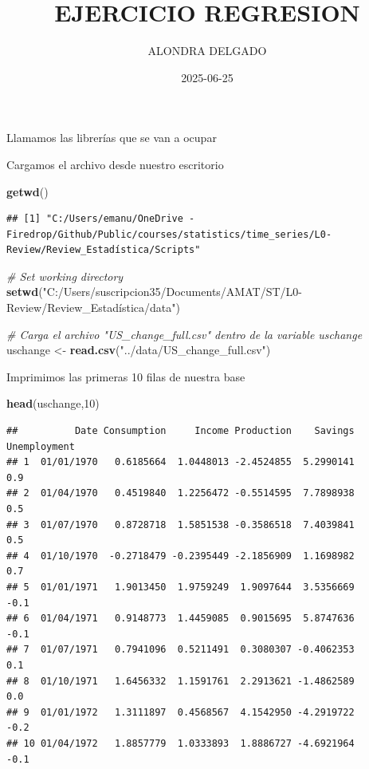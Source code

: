\documentclass[
]{article}
\title{EJERCICIO REGRESION}
\author{ALONDRA DELGADO}
\date{2025-06-25}
\newenvironment{Shaded}{\begin{snugshade}}{\end{snugshade}}
\newcommand{\CommentTok}[1]{\textcolor[rgb]{0.56,0.35,0.01}{\textit{#1}}}
\newcommand{\DecValTok}[1]{\textcolor[rgb]{0.00,0.00,0.81}{#1}}
\newcommand{\FunctionTok}[1]{\textcolor[rgb]{0.13,0.29,0.53}{\textbf{#1}}}
\newcommand{\NormalTok}[1]{#1}
\newcommand{\OtherTok}[1]{\textcolor[rgb]{0.56,0.35,0.01}{#1}}
\newcommand{\StringTok}[1]{\textcolor[rgb]{0.31,0.60,0.02}{#1}}
\begin{document}
\maketitle

Llamamos las librerías que se van a ocupar

Cargamos el archivo desde nuestro escritorio

\begin{Shaded}
\begin{Highlighting}[]
\FunctionTok{getwd}\NormalTok{()}
\end{Highlighting}
\end{Shaded}

\begin{verbatim}
## [1] "C:/Users/emanu/OneDrive - Firedrop/Github/Public/courses/statistics/time_series/L0-Review/Review_Estadística/Scripts"
\end{verbatim}

\begin{Shaded}
\begin{Highlighting}[]
\CommentTok{\# Set working directory}
\FunctionTok{setwd}\NormalTok{(}\StringTok{"C:/Users/suscripcion35/Documents/AMAT/ST/L0{-}Review/Review\_Estadística/data"}\NormalTok{)}

\CommentTok{\# Carga el archivo "US\_change\_full.csv" dentro de la variable uschange}
\NormalTok{uschange }\OtherTok{\textless{}{-}} \FunctionTok{read.csv}\NormalTok{(}\StringTok{"../data/US\_change\_full.csv"}\NormalTok{)}
\end{Highlighting}
\end{Shaded}

Imprimimos las primeras 10 filas de nuestra base

\begin{Shaded}
\begin{Highlighting}[]
\FunctionTok{head}\NormalTok{(uschange,}\DecValTok{10}\NormalTok{)}
\end{Highlighting}
\end{Shaded}

\begin{verbatim}
##          Date Consumption     Income Production    Savings Unemployment
## 1  01/01/1970   0.6185664  1.0448013 -2.4524855  5.2990141          0.9
## 2  01/04/1970   0.4519840  1.2256472 -0.5514595  7.7898938          0.5
## 3  01/07/1970   0.8728718  1.5851538 -0.3586518  7.4039841          0.5
## 4  01/10/1970  -0.2718479 -0.2395449 -2.1856909  1.1698982          0.7
## 5  01/01/1971   1.9013450  1.9759249  1.9097644  3.5356669         -0.1
## 6  01/04/1971   0.9148773  1.4459085  0.9015695  5.8747636         -0.1
## 7  01/07/1971   0.7941096  0.5211491  0.3080307 -0.4062353          0.1
## 8  01/10/1971   1.6456332  1.1591761  2.2913621 -1.4862589          0.0
## 9  01/01/1972   1.3111897  0.4568567  4.1542950 -4.2919722         -0.2
## 10 01/04/1972   1.8857779  1.0333893  1.8886727 -4.6921964         -0.1
\end{verbatim}
\end{document}
